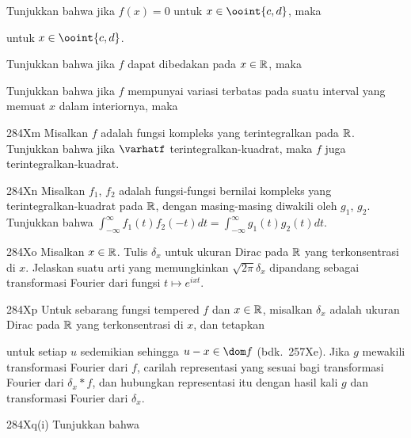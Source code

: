 { Tunjukkan bahwa jika $f(x)=0$ untuk $x\in\ooint{c,d}$, maka


\noindent untuk $x\in\ooint{c,d}$.

 Tunjukkan bahwa jika $f$ dapat dibedakan pada $x\in\Bbb R$, maka


 Tunjukkan bahwa jika $f$ mempunyai variasi terbatas pada suatu
interval yang memuat $x$ dalam interiornya, maka


\spheader 284Xm Misalkan $f$ adalah fungsi kompleks yang terintegralkan pada
$\Bbb R$. Tunjukkan bahwa jika $\varhatf$ terintegralkan-kuadrat, maka $f$ juga
terintegralkan-kuadrat. %

\spheader 284Xn Misalkan $f_1$, $f_2$ adalah fungsi-fungsi bernilai kompleks
yang terintegralkan-kuadrat pada $\Bbb R$, dengan \Ft{} masing-masing diwakili
oleh $g_1$, $g_2$. Tunjukkan bahwa
$\int_{-\infty}^{\infty}f_1(t)f_2(-t)dt
=\int_{-\infty}^{\infty}g_1(t)g_2(t)dt$. %

\spheader 284Xo Misalkan $x\in\Bbb R$. Tulis $\delta_x$ untuk ukuran Dirac
pada $\Bbb R$ yang terkonsentrasi di $x$. Jelaskan suatu arti yang memungkinkan
$\sqrt{2\pi}\delta_x$ dipandang sebagai transformasi Fourier dari fungsi
$t\mapsto e^{ixt}$.

\spheader 284Xp Untuk sebarang fungsi tempered $f$ dan $x\in\Bbb R$, misalkan
$\delta_x$ adalah ukuran Dirac pada $\Bbb R$ yang terkonsentrasi di $x$, dan
tetapkan


\noindent untuk setiap $u$ sedemikian sehingga $u-x\in\dom f$ (bdk.\ 257Xe).
Jika $g$ mewakili transformasi Fourier dari $f$, carilah representasi yang
sesuai bagi transformasi Fourier dari $\delta_x*f$, dan hubungkan representasi
itu dengan hasil kali $g$ dan transformasi Fourier dari $\delta_x$. %

\spheader 284Xq(i) Tunjukkan bahwa


}
